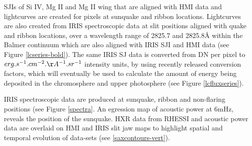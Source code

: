 SJIs of Si IV, Mg II and Mg II wing that are aligned with HMI data and lightcurves are created for pixels at sunquake and ribbon locations. Lightcurves are also created from IRIS spectroscopic data at slit positions aligned with quake and ribbon locations, over a wavelength range of 2825.7 and 2825.8Å within the Balmer continuum which are also aligned with IRIS SJI and HMI data (see Figure \ref{lcseries-bold}). The same IRIS SJ data is converted from DN per pixel to $erg.s^{-1}.cm^{-2}.\AA^{-1}.sr^{-1}$ intensity units, by using recently released conversion factors, which will eventually be used to calculate the amount of energy being deposited in the chromosphere and upper photosphere (see Figure \ref{lcfluxseries}).   

IRIS spectroscopic data are produced at sunquake, ribbon and non-flaring positions (see Figure \ref{spectra}. An egression map of acoustic power  at 6mHz, reveals the position of the sunquake. HXR data from RHESSI and acoustic power data are overlaid on HMI and IRIS slit jaw maps to highlight spatial and temporal evolution of data-sets (see \ref{saxcontours-vert}).\\

